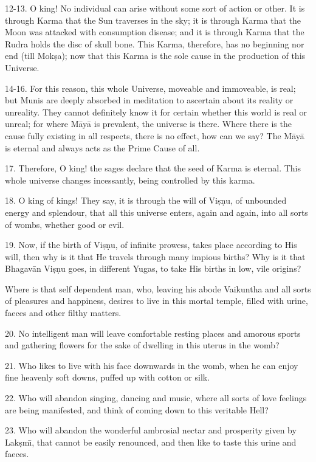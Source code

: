 12-13. O king! No individual can arise without some sort of action or other. It is through Karma that the Sun traverses in the sky; it is through Karma that the Moon was attacked with consumption disease; and it is through Karma that the Rudra holds the disc of skull bone. This Karma, therefore, has no beginning nor end (till Mok\d{s}a); now that this Karma is the sole cause in the production of this Universe.

14-16. For this reason, this whole Universe, moveable and immoveable, is real; but Munis are deeply absorbed in meditation to ascertain about its reality or unreality. They cannot definitely know it for certain whether this world is real or unreal; for where M\=ay\=a is prevalent, the universe is there. Where there is the cause fully existing in all respects, there is no effect, how can we say? The M\=ay\=a is eternal and always acts as the Prime Cause of all.

17. Therefore, O king! the sages declare that the seed of Karma is eternal. This whole universe changes incessantly, being controlled by this karma.

18. O king of kings! They say, it is through the will of Vi\d{s}\d{n}u, of unbounded energy and splendour, that all this universe enters, again and again, into all sorts of wombs, whether good or evil.

19. Now, if the birth of Vi\d{s}\d{n}u, of infinite prowess, takes place according to His will, then why is it that He travels through many impious births? Why is it that Bhagav\=an Vi\d{s}\d{n}u goes, in different Yugas, to take His births in low, vile origins?

Where is that self dependent man, who, leaving his abode Vaikuntha and all sorts of pleasures and happiness, desires to live in this mortal temple, filled with urine, faeces and other filthy matters.

20. No intelligent man will leave comfortable resting places and amorous sports and gathering flowers for the sake of dwelling in this uterus in the womb?

21. Who likes to live with his face downwards in the womb, when he can enjoy fine heavenly soft downs, puffed up with cotton or silk.

22. Who will abandon singing, dancing and music, where all sorts of love feelings are being manifested, and think of coming down to this veritable Hell?

23. Who will abandon the wonderful ambrosial nectar and prosperity given by Lak\d{s}m\={\i}, that cannot be easily renounced, and then like to taste this urine and faeces.

